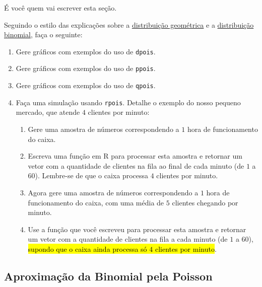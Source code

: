 \documentclass[
  11pt]{report}
\begin{document}
É você quem vai escrever esta seção.

Seguindo o estilo das explicações sobre a \protect\hyperlink{em-r-2}{distribuição geométrica} e a \protect\hyperlink{em-r-3}{distribuição binomial}, faça o seguinte:

\begin{enumerate}
\def\labelenumi{\arabic{enumi}.}
\item
  Gere gráficos com exemplos do uso de \texttt{dpois}.
\item
  Gere gráficos com exemplos do uso de \texttt{ppois}.
\item
  Gere gráficos com exemplos do uso de \texttt{qpois}.
\item
  Faça uma simulação usando \texttt{rpois}. Detalhe o exemplo do nosso pequeno mercado, que atende $4$ clientes por minuto:

  \begin{enumerate}
  \def\labelenumii{\alph{enumii}.}
  \item
    Gere uma amostra de números correspondendo a $1$ hora de funcionamento do caixa.
  \item
    Escreva uma função em R para processar esta amostra e retornar um vetor com a quantidade de clientes na fila ao final de cada minuto (de $1$ a $60$). Lembre-se de que o caixa processa $4$ clientes por minuto.
  \item
    Agora gere uma amostra de números correspondendo a $1$ hora de funcionamento do caixa, com uma média de $5$ clientes chegando por minuto.
  \item
    Use a função que você escreveu para processar esta amostra e retornar um vetor com a quantidade de clientes na fila a cada minuto (de $1$ a $60$), {\hl{supondo que o caixa ainda processa só $4$ clientes por minuto}}.
  \end{enumerate}
\end{enumerate}

\hypertarget{aproximauxe7uxe3o-da-binomial-pela-poisson}{%
\subsection{Aproximação da Binomial pela Poisson}\label{aproximauxe7uxe3o-da-binomial-pela-poisson}}
\end{document}
